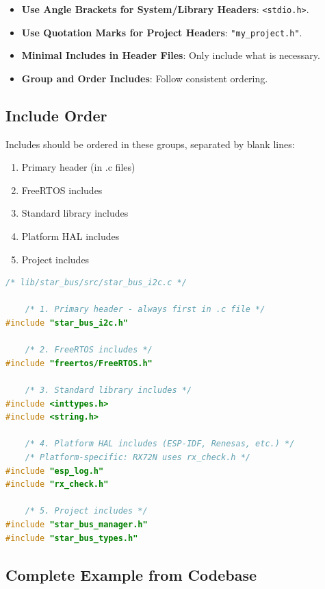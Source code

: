 \begin{itemize}
    \item \textbf{Use Angle Brackets for System/Library Headers}: \texttt{<stdio.h>}.
    \item \textbf{Use Quotation Marks for Project Headers}: \texttt{"my\_project.h"}.
    \item \textbf{Minimal Includes in Header Files}: Only include what is necessary.
    \item \textbf{Group and Order Includes}: Follow consistent ordering.
\end{itemize}

\subsection{Include Order}

Includes should be ordered in these groups, separated by blank lines:

\begin{enumerate}
    \item Primary header (in .c files)
    \item FreeRTOS includes
    \item Standard library includes
    \item Platform HAL includes
    \item Project includes
\end{enumerate}

\begin{lstlisting}[language=C]
    /* lib/star_bus/src/star_bus_i2c.c */

    /* 1. Primary header - always first in .c file */
#include "star_bus_i2c.h"

    /* 2. FreeRTOS includes */
#include "freertos/FreeRTOS.h"

    /* 3. Standard library includes */
#include <inttypes.h>
#include <string.h>

    /* 4. Platform HAL includes (ESP-IDF, Renesas, etc.) */
    /* Platform-specific: RX72N uses rx_check.h */
#include "esp_log.h"
#include "rx_check.h"

    /* 5. Project includes */
#include "star_bus_manager.h"
#include "star_bus_types.h"
\end{lstlisting}

\subsection{Complete Example from Codebase}

